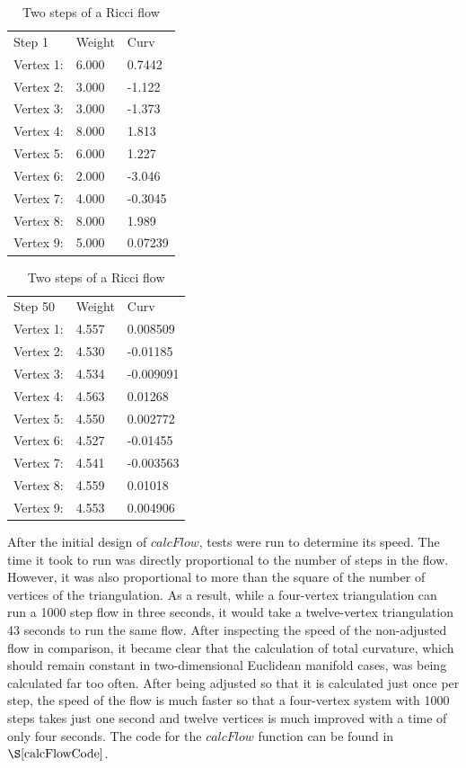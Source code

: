 \documentclass[12pt]{article}
\begin{document}
\begin{table}
\begin{center}
\begin{minipage}{2.2in}
\begin{tabular}{l|l|l}
\hline
Step 1   & Weight &  Curv\\
Vertex 1:& 6.000 & 0.7442\\
Vertex 2: &3.000 & -1.122\\
Vertex 3:& 3.000 & -1.373\\
Vertex 4:& 8.000 & 1.813\\
Vertex 5: &6.000 & 1.227\\
Vertex 6: &2.000 & -3.046\\
Vertex 7: &4.000 & -0.3045\\
Vertex 8: &8.000 & 1.989\\
Vertex 9: &5.000 & 0.07239\\ \hline
\end{tabular} 
\end{minipage}
\begin{minipage}{2.2in}
\begin{tabular}{l|l|l}
\hline
Step 50 &  Weight &  Curv\\
Vertex 1:& 4.557 & 0.008509\\
Vertex 2: &4.530 & -0.01185\\
Vertex 3: &4.534 & -0.009091\\
Vertex 4:& 4.563 & 0.01268\\
Vertex 5:& 4.550 & 0.002772\\
Vertex 6: &4.527 & -0.01455\\
Vertex 7: &4.541 & -0.003563\\
Vertex 8: &4.559 & 0.01018\\
Vertex 9: &4.553 & 0.004906\\ \hline
\end{tabular}
\end{minipage}
\end{center}
\caption{Two steps of a Ricci flow}
\label{tab:ricciSteps}
\end{table}

\noindent After the initial design of $calcFlow$, tests were run to determine its speed. The time it took to run was directly proportional to the number of steps in the flow. However, it was also proportional to more than the square of the number of vertices of the triangulation. As a result, while a four-vertex triangulation can run a 1000 step flow in three seconds, it would take a twelve-vertex triangulation 43 seconds to run the same flow. After inspecting the speed of the non-adjusted flow in comparison, it became clear that the calculation of total curvature, which should remain constant in two-dimensional Euclidean manifold cases, was being calculated far too often. After being adjusted so that it is calculated just once per step, the speed of the flow is much faster so that a four-vertex system with 1000 steps takes just one second and twelve vertices is much improved with a time of only four seconds. The code for the $calcFlow$ function can be found in $\S\ref{calcFlowCode}$.
\end{document}
